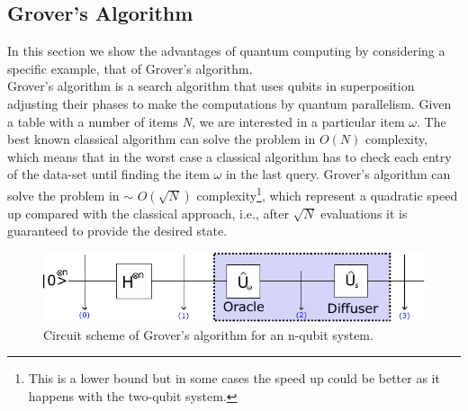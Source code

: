 \subsection{Grover's Algorithm}
In this section we show the advantages of quantum computing by considering a specific example, that of Grover's algorithm.\\
Grover's algorithm is a search algorithm that uses qubits in superposition adjusting their phases to make the computations by quantum parallelism. Given a table with a number of items \textit{N}, we are interested in a particular item $\omega$. The best known classical algorithm can solve the problem in $O(N)$ complexity, which means that in the worst case a classical algorithm has to check each entry of the data-set until finding the item $\omega$ in the last query. Grover's algorithm can solve the problem in $\sim$ $O(\sqrt{N})$ complexity\footnote{This is a lower bound but in some cases the speed up could be better as it happens with the two-qubit system.}, which represent a quadratic speed up compared with the classical approach, i.e., after $\sqrt{N}$ evaluations it is guaranteed to provide the desired state.
\begin{figure}[H]
    \includegraphics[width=\textwidth]{Figures/Grover_Circuit.pdf}
    \caption{Circuit scheme of Grover's algorithm for an n-qubit system.}
    \label{fig:Grover_circuit}
\end{figure}
